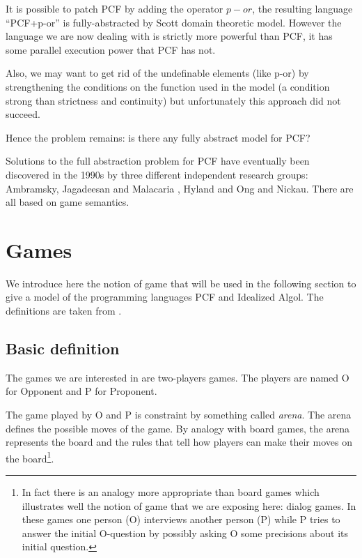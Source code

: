 It is possible to patch PCF by adding the operator $p-or$, the
resulting language ``PCF+p-or'' is fully-abstracted by Scott domain
theoretic model. However the language we are now dealing with is
strictly more powerful than PCF, it has some parallel execution
power that PCF has not.

Also, we may want to get rid of the undefinable elements (like p-or)
by strengthening the conditions on the function used in the model (a
condition strong than strictness and continuity) but unfortunately
this approach did not succeed.

Hence the problem remains: is there any fully abstract model for
PCF?

Solutions to the full abstraction problem for PCF have eventually
been discovered in the 1990s by three different independent research
groups: Ambramsky, Jagadeesan and Malacaria \cite{abramsky94full},
Hyland and Ong \cite{hylandong_pcf} and Nickau. There are all based
on game semantics.


\section{Games}

\label{sec:catgames}

We introduce here the notion of game that will be used in the following section to give a model of the programming languages
PCF and Idealized Algol. The definitions are taken from \cite{abramsky:game-semantics, hylandong_pcf, abramsky94full}.

\subsection{Basic definition}

The games we are interested in are two-players games. The players are named O for Opponent and P for Proponent.

The game played by O and P is constraint by something called \emph{arena}. The arena defines the possible moves of the game.
By analogy with board games, the arena represents the board and the rules that tell how players can make their moves
on the board\footnote{In fact there is an analogy more appropriate than board games which illustrates
well the notion of game that we are exposing here: dialog games.
In these games one person (O) interviews another person (P) while
P tries to answer the initial O-question by possibly asking O some precisions about its initial question.}.


